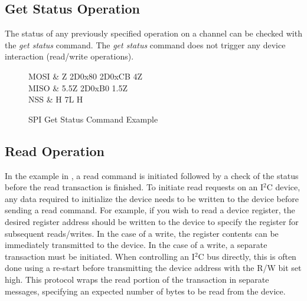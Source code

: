 \subsection{Get Status Operation}


The status of any previously specified operation on a channel can be checked with the \textit{get status} command. The \textit{get status} command does not trigger any device interaction (\ie read/write operations).

\begin{figure}
\centering
	\begin{tikztimingtable}[
		xscale=2.0,
		yscale=1.5,
		timing/name/.style={font=\normalfont},
		timing/table/header/.style={font=\normalfont},
		timing/x/.style={black},
		timing/z/.style={black},
		timing/slope=0.2,
		timing/c/no arrows,
		timing/c/arrow tip=stealth,
		timing/c/arrow pos=0.75,
	    	]
    	MOSI 		& Z 2D{0x80} 2D{0xCB} 4Z\\
	MISO		& 5.5Z 2D{0xB0} 1.5Z \\
	NSS		& H 7{L} H \\
    \end{tikztimingtable}
    \caption{SPI Get Status Command Example}
\end{figure}



\subsection{Read Operation}

In the example in , a read command is initiated followed by a check of the status before the read transaction is finished. To initiate read requests on an I$^2$C device, any data required to initialize the device needs to be written to the device before sending a read command. For example, if you wish to read a device register, the desired register address should be written to the device to specify the register for subsequent reads/writes. In the case of a write, the register contents can be immediately transmitted to the device. In the case of a write, a separate transaction must be initiated. When controlling an I$^2$C bus directly, this is often done using a re-start before transmitting the device address with the R/W bit set high. This protocol wraps the read portion of the transaction in separate messages, specifying an expected number of bytes to be read from the device.

